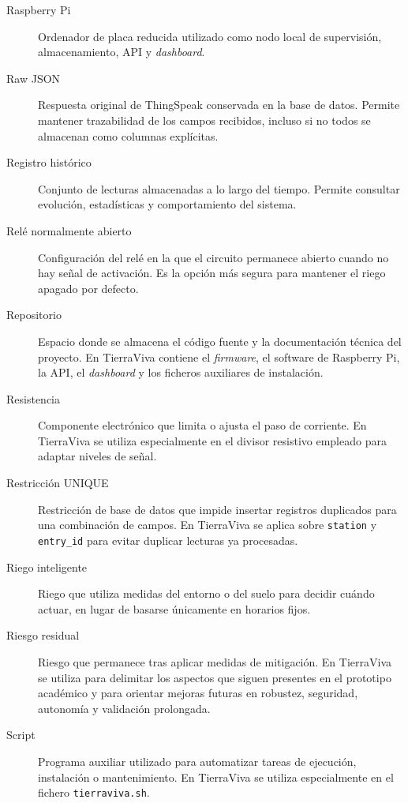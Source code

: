 \begin{description}
    \item[Raspberry Pi]
    Ordenador de placa reducida utilizado como nodo local de supervisión, almacenamiento, API y \textit{dashboard}.

    \item[Raw JSON]
    Respuesta original de ThingSpeak conservada en la base de datos. Permite mantener trazabilidad de los campos recibidos, incluso si no todos se almacenan como columnas explícitas.

    \item[Registro histórico]
    Conjunto de lecturas almacenadas a lo largo del tiempo. Permite consultar evolución, estadísticas y comportamiento del sistema.

    \item[Relé normalmente abierto]
    Configuración del relé en la que el circuito permanece abierto cuando no hay señal de activación. Es la opción más segura para mantener el riego apagado por defecto.
    
    \item[Repositorio]
    Espacio donde se almacena el código fuente y la documentación técnica del proyecto. En TierraViva contiene el \textit{firmware}, el software de Raspberry Pi, la API, el \textit{dashboard} y los ficheros auxiliares de instalación.

    \item[Resistencia]
    Componente electrónico que limita o ajusta el paso de corriente. En TierraViva se utiliza especialmente en el divisor resistivo empleado para adaptar niveles de señal.

    \item[Restricción UNIQUE]
    Restricción de base de datos que impide insertar registros duplicados para una combinación de campos. En TierraViva se aplica sobre \texttt{station} y \texttt{entry\_id} para evitar duplicar lecturas ya procesadas.

    \item[Riego inteligente]
    Riego que utiliza medidas del entorno o del suelo para decidir cuándo actuar, en lugar de basarse únicamente en horarios fijos.

    \item[Riesgo residual]
    Riesgo que permanece tras aplicar medidas de mitigación. En TierraViva se utiliza para delimitar los aspectos que siguen presentes en el prototipo académico y para orientar mejoras futuras en robustez, seguridad, autonomía y validación prolongada.

    \item[Script]
    Programa auxiliar utilizado para automatizar tareas de ejecución, instalación o mantenimiento. En TierraViva se utiliza especialmente en el fichero \texttt{tierraviva.sh}.


\end{description}

